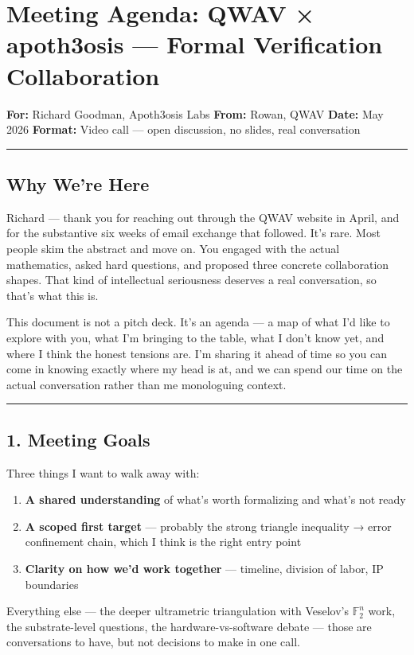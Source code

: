 \documentclass[11pt,a4paper]{article}
\begin{document}
\section*{Meeting Agenda: QWAV × apoth3osis — Formal Verification Collaboration}

\textbf{For:} Richard Goodman, Apoth3osis Labs \textbf{From:} Rowan, QWAV \textbf{Date:} May 2026 \textbf{Format:} Video call — open discussion, no slides, real conversation

\bigskip
\noindent\rule{\textwidth}{0.4pt}
\bigskip
\subsection*{Why We're Here}

Richard — thank you for reaching out through the QWAV website in April, and for the substantive six weeks of email exchange that followed. It's rare. Most people skim the abstract and move on. You engaged with the actual mathematics, asked hard questions, and proposed three concrete collaboration shapes. That kind of intellectual seriousness deserves a real conversation, so that's what this is.

This document is not a pitch deck. It's an agenda — a map of what I'd like to explore with you, what I'm bringing to the table, what I don't know yet, and where I think the honest tensions are. I'm sharing it ahead of time so you can come in knowing exactly where my head is at, and we can spend our time on the actual conversation rather than me monologuing context.

\bigskip
\noindent\rule{\textwidth}{0.4pt}
\bigskip
\subsection*{1. Meeting Goals}

Three things I want to walk away with:

\begin{enumerate}[nosep]
\item \textbf{A shared understanding} of what's worth formalizing and what's not ready
\item \textbf{A scoped first target} — probably the strong triangle inequality → error confinement chain, which I think is the right entry point
\item \textbf{Clarity on how we'd work together} — timeline, division of labor, IP boundaries
\end{enumerate}

Everything else — the deeper ultrametric triangulation with Veselov's $\mathbb{F}_2^n$ work, the substrate-level questions, the hardware-vs-software debate — those are conversations to have, but not decisions to make in one call.
\end{document}

